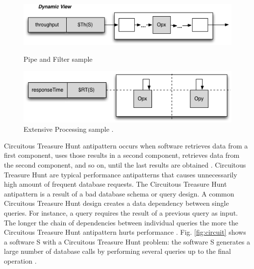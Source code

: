 \documentclass[espaco=umemeio,chapter=TITLE,twoside,openright]{abnt}
\begin{document}
\begin{figure}[h]
\begin{minipage}{.5\textwidth}
\centering
\includegraphics[width=1\textwidth]{./images/pipe2.png}
\caption{Pipe and Filter sample \cite{Vetoio2011}}
\label{fig:pipefilter}
\end{minipage}
\begin{minipage}{.5\textwidth}
\centering
\includegraphics[width=1\textwidth]{./images/extpro.png}
\caption{Extensive Processing sample \cite{Vetoio2011}.}
\label{fig:extpro}
\end{minipage}
\end{figure}


Circuitous Treasure Hunt antipattern occurs when software retrieves data from a first component, uses those results in a second component, retrieves data from the second component, and so on, until the last results are obtained \cite{Smith2002} \cite{Smith2003}. Circuitous Treasure Hunt
are typical performance antipatterns that causes  unnecessarily high amount of frequent database requests. The Circuitous Treasure Hunt antipattern is a result of a bad database schema or query design. A common Circuitous Treasure Hunt design creates a data dependency between single queries. For instance, a query requires the
result of a previous query as input. The longer the chain of
dependencies between individual queries the more the Circuitous
Treasure Hunt antipattern hurts performance \cite{Wert2014}. Fig. \ref{fig:circuit}  shows a software S with a Circuitous Treasure Hunt problem: the software  S generates a large number of database calls by performing several queries up to the final operation \cite{Vetoio2011}.
\end{document}
